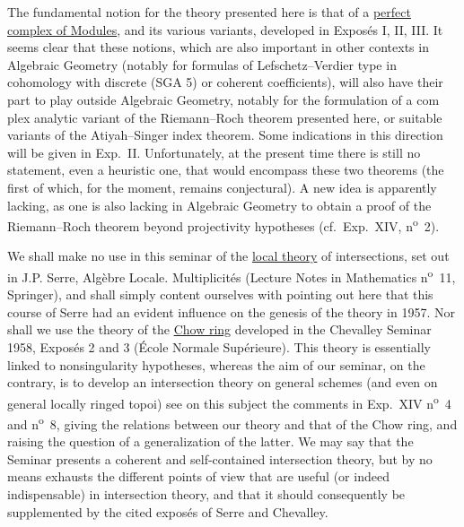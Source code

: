 The fundamental notion for the theory presented here is that of a \underline{perfect complex of Modules}, and its various variants, developed in Exposés I, II, III. It seems clear that these notions, which are also important in other contexts in Algebraic Geometry (notably for formulas of Lefschetz--Verdier type in cohomology with discrete (SGA 5) or coherent coefficients), will also have their part to play outside Algebraic Geometry, notably for the formulation of a com%
plex%
 analytic variant of the Riemann--Roch theorem presented here, or suitable variants of the Atiyah--Singer index theorem. Some indications in this direction will be given in Exp.\ II. Unfortunately, at the present time there is still no statement, even a heuristic one, that would encompass these two theorems (the first of which, for the moment, remains conjectural). A new idea is apparently lacking, as one is also lacking in Algebraic Geometry to obtain a proof of the Riemann--Roch theorem beyond projectivity hypotheses (cf.\ Exp.\ XIV, n\textsuperscript{o}~2).

We shall make no use in this seminar of the \underline{local theory} of intersections, set out in J.P. Serre, Algèbre Locale. Multiplicités (Lecture Notes in Mathematics n\textsuperscript{o}~11, Springer), and shall simply content ourselves with pointing out here that this course of Serre had an evident influence on the genesis of the theory in 1957. Nor shall we use the theory of the \underline{Chow ring} developed in the Chevalley Seminar 1958, Exposés 2 and 3 (École Normale Supérieure). This theory is essentially linked to nonsingularity hypotheses, whereas the aim of our seminar, on the contrary, is to develop an intersection theory on general schemes (and even on general locally ringed topoi) see on this subject the comments in Exp.\ XIV n\textsuperscript{o}~4 and n\textsuperscript{o}~8, giving the relations between our theory and that of the Chow ring, and raising the question of a generalization of the latter. We may say that the Seminar presents a coherent and self-contained intersection theory, but by no means exhausts the different points of view that are useful (or indeed indispensable) in intersection theory, and that it should consequently be supplemented by the cited exposés of Serre and Chevalley.

